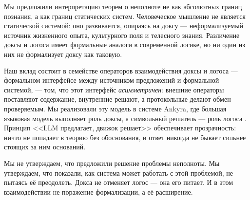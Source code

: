 \documentclass[12pt,a4paper]{article}
\begin{document}
Мы предложили интерпретацию теорем о неполноте не как абсолютных границ познания, а как границ статических систем.
Человеческое мышление не является статической системой: оно развивается, опираясь на доксу --- неформализуемый
источник жизненного опыта, культурного поля и телесного знания. Различение доксы и логоса имеет формальные аналоги
в современной логике, но ни один из них не формализует доксу как таковую.

Наш вклад состоит в семействе операторов взаимодействия доксы и логоса ---
формальном интерфейсе между источником предложений и формальной системой, ---
том, что этот интерфейс \emph{асимметричен}: внешние операторы поставляют
содержание, внутренние решают, а протокольные делают обмен проверяемым. Мы
реализовали эту модель в системе Ankyra, где большая языковая модель выполняет
роль доксы, а символьный решатель --- роль логоса \cite{ankyra}. Принцип <<LLM предлагает,
движок решает>> обеспечивает прозрачность: ничто не попадает в теорию без
обоснования, и ответ никогда не бывает сильнее стоящих за ним оснований.

Мы не утверждаем, что предложили решение проблемы неполноты. Мы утверждаем, что показали,
как система может работать с этой проблемой, не пытаясь её преодолеть. Докса не отменяет
логос --- она его питает. И в этом взаимодействии не поражение формализации, а её расширение.
\end{document}
